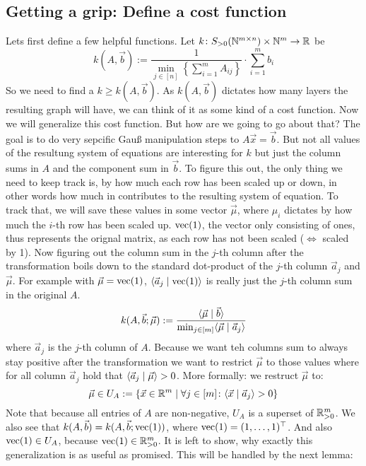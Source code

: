\subsection{Getting a grip: Define a cost function}
Lets first define a few helpful functions. Let $k\colon S_{>0}(\mathbb{N}^{m \times n}) \times \mathbb{N}^m \to \mathbb{R}$ be
$$k(A, \vec b) := \frac{1}{\min_{j \in [n]} \left\{ \sum_{i=1}^{m}A_{ij}\right\}}\cdot \sum_{i=1}^{m}b_i$$
So we need to find a $k \geq k(A, \vec b)$. As $k(A, \vec b)$ dictates how many layers the resulting graph will have, we can think of it as some kind of a cost function. Now we will generalize this cost function. But how are we going to go about that? The goal is to do very sepcific Gauß manipulation steps to $A\vec x = \vec b$. But not all values of the resultung system of equations are interesting for $k$ but just the column sums in $A$ and the component sum in $\vec b$. To figure this out, the only thing we need to keep track is, by how much each row has been scaled up or down, in other words how much in contributes to the resulting system of equation. To track that, we will save these values in some vector $\vec\mu$, where $\mu_i$ dictates by how much the $i$-th row has been scaled up. $\operatorname{vec}(1)$, the vector only consisting of ones, thus represents the orignal matrix, as each row has not been scaled ($\Leftrightarrow$ scaled by 1). Now figuring out the column sum in the $j$-th column after the transformation boils down to the standard dot-product of the $j$-th column $\vec a_j$ and $\vec\mu$. For example with $\vec \mu = \operatorname{vec}(1)$, $\langle \vec a_j \mid \operatorname{vec}(1) \rangle$ is really just the $j$-th column sum in the original $A$. 
$$k(A, \vec b; \vec \mu) := \frac{\langle \vec{\mu} \mid \vec b \rangle}{\min_{j \in [m]} \langle \vec \mu \mid \vec a_j \rangle}$$
where $\vec a_j$ is the $j$-th column of $A$. Because we want teh columns sum to always stay positive after the transformation we want to restrict $\vec\mu$ to those values where for all column $\vec a_j$ hold that $\langle \vec a_j \mid \vec\mu \rangle > 0$. More formally: we restruct $\vec\mu$ to:
$$\vec \mu \in U_A := \{\vec x \in \mathbb{R}^m \mid \forall j \in [m]\colon \langle \vec x \mid \vec a_j \rangle > 0\}$$
Note that because all entries of $A$ are non-negative, $U_A$ is a superset of $\mathbb{R}_{>0}^m$. We also see that $k(A, \vec b) = k(A, \vec b; \operatorname{vec}(1))$, where $\operatorname{vec}(1) = (1, \dots, 1)^\top$. And also $\operatorname{vec}(1) \in U_A$, because $\operatorname{vec}(1) \in \mathbb{R}^m_{>0}$. It is left to show, why exactly this generalization is as useful as promised. This will be handled by the next lemma:
